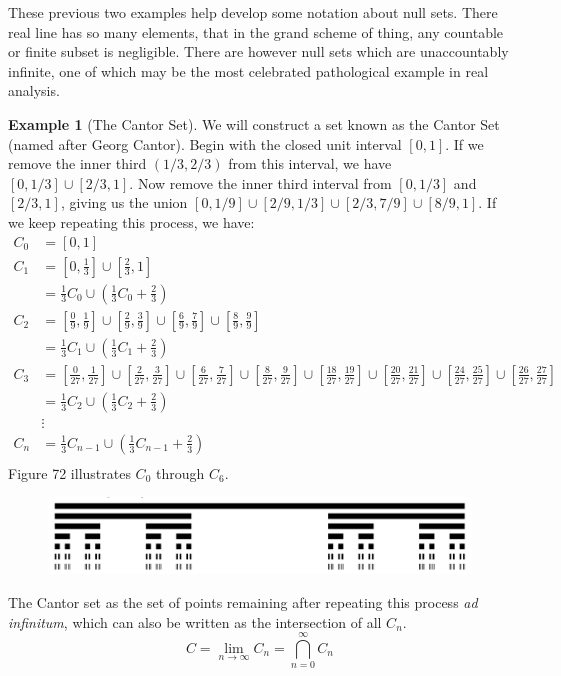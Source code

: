 \documentclass{article}
\theoremstyle{definition}
\newtheorem{example}{Example}[section]
\begin{document}
	These previous two examples help develop some notation about null sets. There real line has so many elements, that in the grand scheme of thing, any countable or finite subset is negligible. There are however null sets which are unaccountably infinite, one of which may be the most celebrated pathological example in real analysis. 
	\begin{example}[The Cantor Set]
		We will construct a set known as the Cantor Set (named after Georg Cantor). Begin with the closed unit interval $ [0,1] $. If we remove the inner third $ (1/3,2/3) $ from this interval, we have $ [0,1/3]\cup [2/3,1] $. Now remove the inner third interval from $  [0,1/3] $ and $ [2/3,1] $, giving us the union $[0,1/9]\cup [2/9,1/3]\cup[2/3,7/9]\cup[8/9,1]$. If we keep repeating this process, we have:
		\begin{align*}
			C_0 &= [0,1]\\
			C_1 &= \left[0,\frac{1}{3}\right]\cup \left[\frac{2}{3},1\right]\\
			& = \frac{1}{3}C_0 \cup \left(\frac{1}{3}C_0 + \frac{2}{3}\right)\\
			C_2 &= \left[\frac{0}{9},\frac{1}{9}\right]\cup  \left[\frac{2}{9},\frac{3}{9}\right]\cup \left[\frac{6}{9},\frac{7}{9}\right]\cup \left[\frac{8}{9},\frac{9}{9}\right]\\
			& = \frac{1}{3}C_1 \cup \left(\frac{1}{3}C_1 + \frac{2}{3}\right)\\
			C_3 & = \left[\frac{0}{27},\frac{1}{27}\right]\cup  \left[\frac{2}{27},\frac{3}{27}\right]\cup
			\left[\frac{6}{27},\frac{7}{27}\right]\cup  \left[\frac{8}{27},\frac{9}{27}\right]\cup
			\left[\frac{18}{27},\frac{19}{27}\right]\cup  \left[\frac{20}{27},\frac{21}{27}\right]\cup
			\left[\frac{24}{27},\frac{25}{27}\right]\cup  \left[\frac{26}{27},\frac{27}{27}\right]\\ 
			& = \frac{1}{3}C_2 \cup \left(\frac{1}{3}C_2 + \frac{2}{3}\right)\\
			&\vdots\\
			C_n& = \frac{1}{3}C_{n-1} \cup \left(\frac{1}{3}C_{n-1} + \frac{2}{3}\right)\\
		\end{align*}
		Figure 72 illustrates $ C_0 $ through $ C_6 $.
		\begin{figure}[h!]
			\centering
			\includegraphics[width=0.9\linewidth]{figures/cantor}
			\caption{}
		\end{figure}
		The Cantor set as the set of points remaining after repeating this process \textit{ad infinitum}, which can also be written as the intersection of all $ C_n $.
		$$ C = \lim\limits_{n\to\infty} C_n=\bigcap_{n=0}^\infty C_n$$ 
		

\end{example}
\end{document}
